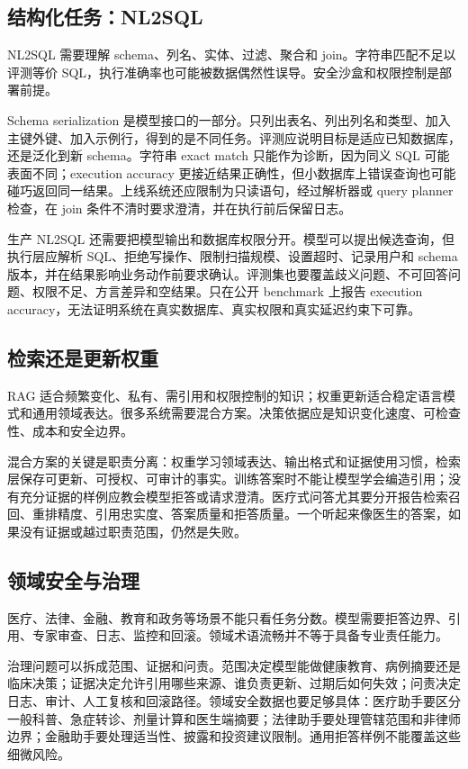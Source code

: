 \documentclass[UTF8,zihao=-4,openany]{ctexbook}
\begin{document}
\subsection{结构化任务：NL2SQL}
NL2SQL 需要理解 schema、列名、实体、过滤、聚合和 join。字符串匹配不足以评测等价 SQL，执行准确率也可能被数据偶然性误导。安全沙盒和权限控制是部署前提。

Schema serialization 是模型接口的一部分。只列出表名、列出列名和类型、加入主键外键、加入示例行，得到的是不同任务。评测应说明目标是适应已知数据库，还是泛化到新 schema。字符串 exact match 只能作为诊断，因为同义 SQL 可能表面不同；execution accuracy 更接近结果正确性，但小数据库上错误查询也可能碰巧返回同一结果。上线系统还应限制为只读语句，经过解析器或 query planner 检查，在 join 条件不清时要求澄清，并在执行前后保留日志。

生产 NL2SQL 还需要把模型输出和数据库权限分开。模型可以提出候选查询，但执行层应解析 SQL、拒绝写操作、限制扫描规模、设置超时、记录用户和 schema 版本，并在结果影响业务动作前要求确认。评测集也要覆盖歧义问题、不可回答问题、权限不足、方言差异和空结果。只在公开 benchmark 上报告 execution accuracy，无法证明系统在真实数据库、真实权限和真实延迟约束下可靠。

\subsection{检索还是更新权重}
RAG 适合频繁变化、私有、需引用和权限控制的知识；权重更新适合稳定语言模式和通用领域表达。很多系统需要混合方案。决策依据应是知识变化速度、可检查性、成本和安全边界。

混合方案的关键是职责分离：权重学习领域表达、输出格式和证据使用习惯，检索层保存可更新、可授权、可审计的事实。训练答案时不能让模型学会编造引用；没有充分证据的样例应教会模型拒答或请求澄清。医疗式问答尤其要分开报告检索召回、重排精度、引用忠实度、答案质量和拒答质量。一个听起来像医生的答案，如果没有证据或越过职责范围，仍然是失败。

\subsection{领域安全与治理}
医疗、法律、金融、教育和政务等场景不能只看任务分数。模型需要拒答边界、引用、专家审查、日志、监控和回滚。领域术语流畅并不等于具备专业责任能力。

治理问题可以拆成范围、证据和问责。范围决定模型能做健康教育、病例摘要还是临床决策；证据决定允许引用哪些来源、谁负责更新、过期后如何失效；问责决定日志、审计、人工复核和回滚路径。领域安全数据也要足够具体：医疗助手要区分一般科普、急症转诊、剂量计算和医生端摘要；法律助手要处理管辖范围和非律师边界；金融助手要处理适当性、披露和投资建议限制。通用拒答样例不能覆盖这些细微风险。
\end{document}

